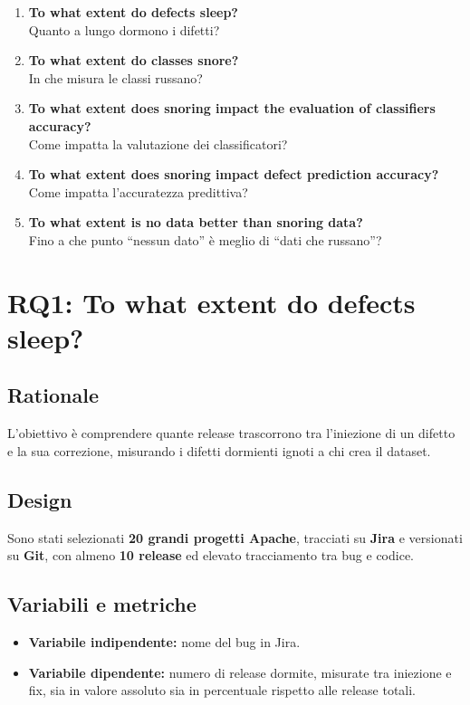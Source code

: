 \begin{enumerate}
    \item \textbf{To what extent do defects sleep?} \\
    Quanto a lungo dormono i difetti?
    \item \textbf{To what extent do classes snore?} \\
    In che misura le classi russano?
    \item \textbf{To what extent does snoring impact the evaluation of classifiers accuracy?} \\
    Come impatta la valutazione dei classificatori?
    \item \textbf{To what extent does snoring impact defect prediction accuracy?} \\
    Come impatta l'accuratezza predittiva?
    \item \textbf{To what extent is no data better than snoring data?} \\
    Fino a che punto ``nessun dato'' è meglio di ``dati che russano''?
\end{enumerate}

\section{RQ1: To what extent do defects sleep?}

\subsection{Rationale}

L'obiettivo è comprendere quante release trascorrono tra l'iniezione di un difetto e la sua correzione, misurando i difetti dormienti ignoti a chi crea il dataset.

\subsection{Design}

Sono stati selezionati \textbf{20 grandi progetti Apache}, tracciati su \textbf{Jira} e versionati su \textbf{Git}, con almeno \textbf{10 release} ed elevato tracciamento tra bug e codice.

\subsection{Variabili e metriche}

\begin{itemize}
    \item \textbf{Variabile indipendente:} nome del bug in Jira.
    \item \textbf{Variabile dipendente:} numero di release dormite, misurate tra iniezione e fix, sia in valore assoluto sia in percentuale rispetto alle release totali.
\end{itemize}

